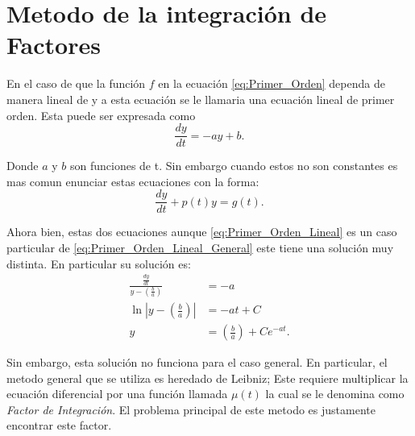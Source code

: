 \documentclass{report}
\begin{document}
\section{Metodo de la integración de Factores}
En el caso de que la función $f$ en la ecuación \ref{eq:Primer_Orden} dependa de manera lineal de y a esta ecuación se le llamaria una ecuación lineal de primer orden. Esta puede ser expresada como
\begin{equation}
  \label{eq:Primer_Orden_Lineal}
  \frac{dy}{dt}=-ay+b
.\end{equation}

Donde $a$ y $b$ son funciones de t. Sin embargo cuando estos no son constantes es mas comun enunciar estas ecuaciones con la forma:
\begin{equation}
  \label{eq:Primer_Orden_Lineal_General}
  \frac{dy}{dt}+p(t)y=g(t)
.\end{equation}

Ahora bien, estas dos ecuaciones aunque \ref{eq:Primer_Orden_Lineal} es un caso particular de \ref{eq:Primer_Orden_Lineal_General} este tiene una solución muy distinta. En particular su solución es:
\begin{align*}
  \frac{\frac{dy}{dt}}{y-\left( \frac{b}{a} \right) }&= -a \\
  \ln\left| y -\left( \frac{b}{a} \right)  \right| &= -at + C \\
  y &=  \left( \frac{b}{a} \right) + Ce^{-at}
.\end{align*}

Sin embargo, esta solución no funciona para el caso general. En particular, el metodo general que se utiliza es heredado de Leibniz; Este requiere multiplicar la ecuación diferencial por una función llamada $\mu\left( t \right) $ la cual se le denomina como \textit{Factor de Integración}. El problema principal de este metodo es justamente encontrar este factor.
\end{document}

